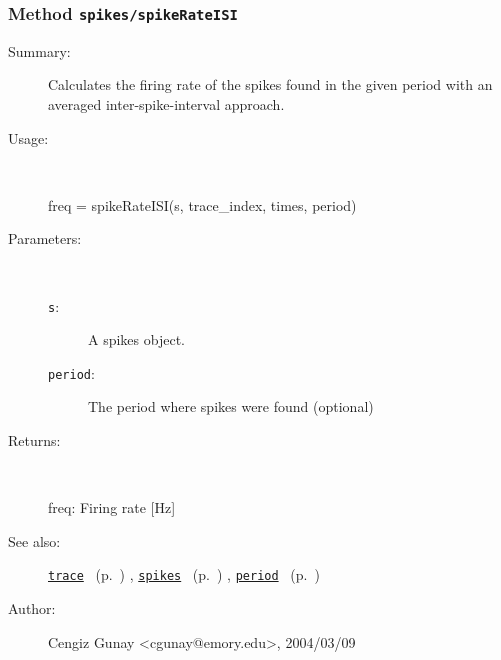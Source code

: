 \subsubsection[Method \texttt{spikeRateISI}]{Method \texttt{spikes/spikeRateISI}}%
%
\label{ref_spikes__spikeRateISI}%
\hypertarget{ref_spikes__spikeRateISI}{}%
\begin{description}
\item[Summary:]Calculates the firing rate of the spikes found in the given 
		period with an averaged inter-spike-interval approach.
%
\item[Usage:]~%
\begin{lyxcode}%
freq = spikeRateISI(s, trace\_index, times, period)
%
\end{lyxcode}%
%
%
\item[Parameters:]~
\begin{description}%
\item[\texttt{s}:]
 A spikes object.
\item[\texttt{period}:]
 The period where spikes were found (optional)
\end{description}%
%
\item[Returns:]~

	freq: Firing rate [Hz]
%
%
\item[See also:]%
\hyperlink{ref_trace}{\texttt{trace}}%
\ (p.~\pageref{ref_trace})%
%
, \hyperlink{ref_spikes}{\texttt{spikes}}%
\ (p.~\pageref{ref_spikes})%
%
, \hyperlink{ref_period}{\texttt{period}}%
\ (p.~\pageref{ref_period})%
%
%
\item[Author:]%
Cengiz Gunay <cgunay@emory.edu>, 2004/03/09%
\end{description}
\methodline%
